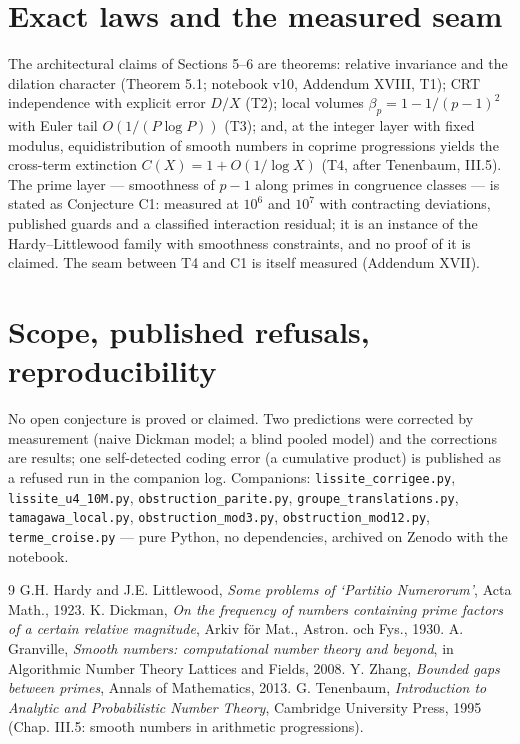 \documentclass[11pt,a4paper]{article}
\theoremstyle{definition}
\begin{document}
\section{Exact laws and the measured seam}
The architectural claims of Sections 5--6 are theorems: relative invariance
and the dilation character (Theorem 5.1; notebook v10, Addendum XVIII, T1);
CRT independence with explicit error $D/X$ (T2); local volumes
$\beta_p=1-1/(p-1)^2$ with Euler tail $O(1/(P\log P))$ (T3); and, at the
integer layer with fixed modulus, equidistribution of smooth numbers in
coprime progressions yields the cross-term extinction
$C(X)=1+O(1/\log X)$ (T4, after Tenenbaum, III.5). The prime layer ---
smoothness of $p-1$ along primes in congruence classes --- is stated as
Conjecture C1: measured at $10^6$ and $10^7$ with contracting deviations,
published guards and a classified interaction residual; it is an instance of
the Hardy--Littlewood family with smoothness constraints, and no proof of it
is claimed. The seam between T4 and C1 is itself measured (Addendum XVII).

\section{Scope, published refusals, reproducibility}
No open conjecture is proved or claimed. Two predictions were corrected by
measurement (naive Dickman model; a blind pooled model) and the corrections
are results; one self-detected coding error (a cumulative product) is
published as a refused run in the companion log. Companions:
\texttt{lissite\_corrigee.py}, \texttt{lissite\_u4\_10M.py},
\texttt{obstruction\_parite.py}, \texttt{groupe\_translations.py},
\texttt{tamagawa\_local.py}, \texttt{obstruction\_mod3.py},
\texttt{obstruction\_mod12.py}, \texttt{terme\_croise.py} --- pure Python, no
dependencies, archived on Zenodo with the notebook.

\begin{thebibliography}{9}
 G.H. Hardy and J.E. Littlewood, \emph{Some problems of
`Partitio Numerorum'}, Acta Math., 1923.
 K. Dickman, \emph{On the frequency of numbers containing
prime factors of a certain relative magnitude}, Arkiv f\"or Mat., Astron. och
Fys., 1930.
 A. Granville, \emph{Smooth numbers: computational
number theory and beyond}, in Algorithmic Number Theory Lattices and Fields,
2008.
 Y. Zhang, \emph{Bounded gaps between primes}, Annals of
Mathematics, 2013.
 G. Tenenbaum, \emph{Introduction to Analytic and
Probabilistic Number Theory}, Cambridge University Press, 1995 (Chap. III.5:
smooth numbers in arithmetic progressions).
\end{thebibliography}
\end{document}
